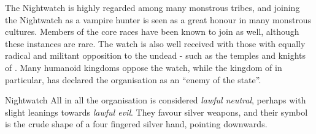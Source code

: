 The Nightwatch is highly regarded among many monstrous tribes, and joining the
Nightwatch as a vampire hunter is seen as a great honour in many monstrous
cultures. Members of the core races have been known to join as well, although
these instances are rare. The watch is also well received with those with
equally radical and militant opposition to the undead - such as the temples
and knights of . Many humanoid kingdoms oppose the watch,
while the kingdom of  in particular, has declared the
organisation as an ``enemy of the state''.

\begin{35e}{Nightwatch}
  All in all the organisation is considered \emph{lawful neutral}, perhaps
  with slight leanings towards \emph{lawful evil}. They favour silver weapons,
  and their symbol is the crude shape of a four fingered silver hand, pointing
  downwards.
\end{35e}
